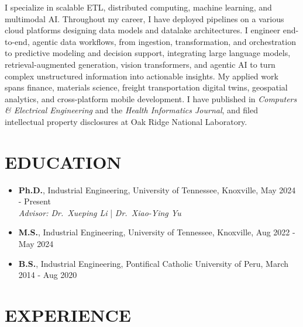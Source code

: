 \documentclass[10pt, letterpaper]{article}
\begin{document}
I specialize in scalable ETL, distributed computing, machine learning, and multimodal AI. Throughout my career, I have deployed pipelines on a various cloud platforms designing data models and datalake architectures. I engineer end-to-end, agentic data workflows, from ingestion, transformation, and orchestration to predictive modeling and decision support, integrating large language models, retrieval-augmented generation, vision transformers, and agentic AI to turn complex unstructured information into actionable insights. My applied work spans finance, materials science, freight transportation digital twins, geospatial analytics, and cross-platform mobile development. I have published in \textit{Computers \& Electrical Engineering} and the \textit{Health Informatics Journal}, and filed intellectual property disclosures at Oak Ridge National Laboratory.


\section{EDUCATION}
\small

\begin{itemize}[topsep=0pt, parsep=0pt, partopsep=0pt, itemsep=3pt, leftmargin=10pt]
    \item \textbf{Ph.D.}, Industrial Engineering, University of Tennessee, Knoxville, May 2024 - Present \\
          \textit{Advisor: Dr.\ Xueping Li} | \textit{Dr.\ Xiao-Ying Yu}
    \item \textbf{M.S.}, Industrial Engineering, University of Tennessee, Knoxville, Aug 2022 - May 2024
    \item \textbf{B.S.}, Industrial Engineering, Pontifical Catholic University of Peru, March 2014 - Aug 2020
\end{itemize}

\section{EXPERIENCE}
\small
\end{document}
